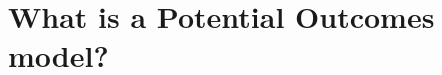 \begin{theorem}\label{th:causal_contractibility_cbn}

\end{theorem}

\section{What is a Potential Outcomes model?}

\section{}





